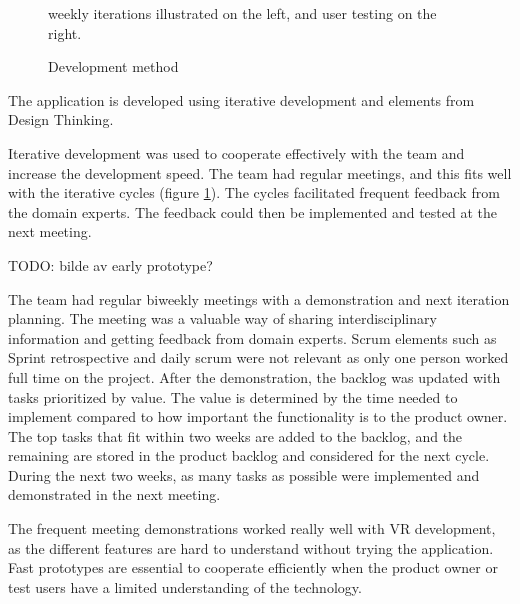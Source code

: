\documentclass[a4paper]{report}
\begin{document}
\begin{figure}[h!]
    \centering
	\hfill
  \caption{Development method}
  \label{agile}
  \small
  weekly iterations illustrated on the left, and user testing on the right.
\end{figure}

The application is developed using iterative development and elements from Design Thinking.

Iterative development was used to cooperate effectively with the team and increase the development speed. The team had regular meetings, and this fits well with the iterative cycles (figure \ref{agile}). The cycles facilitated frequent feedback from the domain experts. The feedback could then be implemented and tested at the next meeting.

TODO: bilde av early prototype?

The team had regular biweekly meetings with a demonstration and next iteration planning. The meeting was a valuable way of sharing interdisciplinary information and getting feedback from domain experts. Scrum elements such as Sprint retrospective and daily scrum were not relevant as only one person worked full time on the project.
After the demonstration, the backlog was updated with tasks prioritized by value. The value is determined by the time needed to implement compared to how important the functionality is to the product owner. The top tasks that fit within two weeks are added to the backlog, and the remaining are stored in the product backlog and considered for the next cycle.
During the next two weeks, as many tasks as possible were implemented and demonstrated in the next meeting.

The frequent meeting demonstrations worked really well with VR development, as the different features are hard to understand without trying the application. Fast prototypes are essential to cooperate efficiently when the product owner or test users have a limited understanding of the technology.
\end{document}
